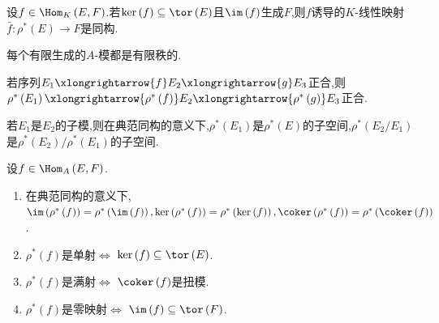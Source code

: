 \begin{corollary}{}{}
	设$f\in\Hom_{K}\left(E,F\right)$.若$\ker\left(f\right)\subseteq\tor\left(E\right)$且$\im\left(f\right)$生成$F$,则$f$诱导的$K$-线性映射$\bar{f}:\rho^{\ast}\left(E\right)\to F$是同构.
\end{corollary}

\begin{corollary}{}{}
	每个有限生成的$A$-模都是有限秩的.
\end{corollary}

\begin{proposition}{}{}
	若序列$E_{1}\xlongrightarrow{f}E_{2}\xlongrightarrow{g}E_{3}$正合,则$\rho^{\ast}\left(E_{1}\right)\xlongrightarrow{\rho^{\ast}\left(f\right)}E_{2}\xlongrightarrow{\rho^{\ast}\left(g\right)}E_{3}$正合.
\end{proposition}

\begin{corollary}{}{}
	若$E_{1}$是$E_{2}$的子模,则在典范同构的意义下,$\rho^{\ast}\left(E_{1}\right)$是$\rho^{\ast}\left(E\right)$的子空间,$\rho^{\ast}\left(E_{2}/E_{1}\right)$是$\rho^{\ast}\left(E_{2}\right)/\rho^{\ast}\left(E_{1}\right)$的子空间.
\end{corollary}

\begin{corollary}{}{}
	设$f\in\Hom_{A}\left(E,F\right)$.
	\begin{enumerate}
		\item 在典范同构的意义下,$\im\left(\rho^{\ast}\left(f\right)\right)=\rho^{\ast}\left(\im\left(f\right)\right),\ker\left(\rho^{\ast}\left(f\right)\right)=\rho^{\ast}\left(\ker\left(f\right)\right),\coker\left(\rho^{\ast}\left(f\right)\right)=\rho^{\ast}\left(\coker\left(f\right)\right)$.
		\item $\rho^{\ast}\left(f\right)$是单射$\iff$ $\ker\left(f\right)\subseteq\tor\left(E\right)$.
		\item $\rho^{\ast}\left(f\right)$是满射$\iff$ $\coker\left(f\right)$是扭模.
		\item $\rho^{\ast}\left(f\right)$是零映射$\iff$ $\im\left(f\right)\subseteq\tor\left(F\right)$.
	\end{enumerate}
\end{corollary}

